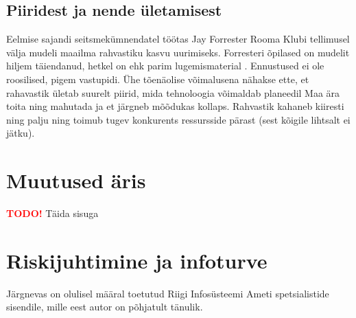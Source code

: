 \documentclass{tufte-book}
\newcommand{\TODO}{\textcolor{red}{\bf TODO!}\xspace}
\begin{document}
\section{Piiridest ja nende ületamisest}
Eelmise sajandi seitsmekümnendatel töötas Jay Forrester Rooma Klubi tellimusel välja mudeli maailma rahvastiku kasvu uurimiseks. Forresteri õpilased on mudelit hiljem täiendanud, hetkel on ehk parim lugemismaterial \cite{meadows1992beyond}. Ennustused ei ole roosilised, pigem vastupidi. Ühe tõenäolise võimalusena nähakse ette, et rahavastik ületab suurelt piirid, mida tehnoloogia võimaldab planeedil Maa ära toita ning mahutada ja et järgneb mõõdukas kollaps. Rahvastik kahaneb kiiresti ning palju ning toimub tugev konkurents ressursside pärast (sest kõigile lihtsalt ei jätku). 

\chapter{Muutused äris}
\TODO Täida sisuga

\chapter{Riskijuhtimine ja infoturve}
Järgnevas on olulisel määral toetutud Riigi Infosüsteemi Ameti spetsialistide sisendile, mille eest autor on põhjatult tänulik.
\end{document}
